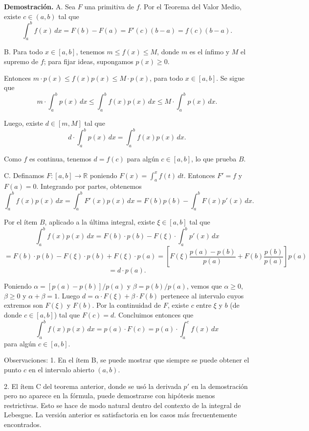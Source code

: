 \documentclass[12pt,oneside]{book}
\begin{document}
\textbf{Demostración.} A. Sea \(F\) una primitiva de \(f\). Por el Teorema del Valor Medio, existe \(c \in (a, b)\) tal que
\[
\int_{a}^{b} f(x) \, dx = F(b) - F(a) = F'(c)(b - a) = f(c)(b - a).
\]

B. Para todo \(x \in [a, b]\), tenemos \(m \leq f(x) \leq M\), donde \(m\) es el ínfimo y \(M\) el supremo de \(f\); para fijar ideas, supongamos \(p(x) \geq 0\).

Entonces \( m \cdot p(x) \leq f(x)p(x) \leq M \cdot p(x) \), para todo \( x \in [a, b] \). Se sigue que
\[
m \cdot \int_a^b p(x) \, dx \leq \int_a^b f(x)p(x) \, dx \leq M \cdot \int_a^b p(x) \, dx.
\]

Luego, existe \( d \in [m, M] \) tal que
\[
d \cdot \int_a^b p(x) \, dx = \int_a^b f(x)p(x) \, dx.
\]

Como \( f \) es continua, tenemos \( d = f(c) \) para algún \( c \in [a, b] \), lo que prueba \( B \).

C. Definamos \( F: [a, b] \to \mathbb{R} \) poniendo \( F(x) = \int_a^x f(t) \, dt \). Entonces \( F' = f \) y \( F(a) = 0 \). Integrando por partes, obtenemos
\[
\int_a^b f(x)p(x) \, dx = \int_a^b F'(x)p(x) \, dx = F(b)p(b) - \int_a^b F(x)p'(x) \, dx.
\]

Por el ítem \( B \), aplicado a la última integral, existe \( \xi \in [a, b] \) tal que
\[
\int_a^b f(x)p(x) \, dx = F(b) \cdot p(b) - F(\xi) \cdot \int_a^b p'(x) \, dx
\]
\[
= F(b) \cdot p(b) - F(\xi) \cdot p(b) + F(\xi) \cdot p(a) = \left[ F(\xi) \frac{p(a) - p(b)}{p(a)} + F(b) \frac{p(b)}{p(a)} \right] p(a)
\]
\[
= d \cdot p(a).
\]

Poniendo \( \alpha = [p(a) - p(b)]/p(a) \) y \( \beta = p(b)/p(a) \), vemos que \( \alpha \geq 0 \), \( \beta \geq 0 \) y \( \alpha + \beta = 1 \). Luego \( d = \alpha \cdot F(\xi) + \beta \cdot F(b) \) pertenece al intervalo cuyos extremos son \( F(\xi) \) y \( F(b) \). Por la continuidad de \( F \), existe \( c \) entre \( \xi \) y \( b \) (de donde \( c \in [a, b] \)) tal que \( F(c) = d \). Concluimos entonces que
\[
\int_a^b f(x)p(x) \, dx = p(a) \cdot F(c) = p(a) \cdot \int_a^c f(x) \, dx
\]
para algún \( c \in [a, b] \).

Observaciones: 1. En el ítem B, se puede mostrar que siempre se puede obtener el punto \(c\) en el intervalo abierto \((a, b)\).

2. El ítem C del teorema anterior, donde se usó la derivada \(p'\) en la demostración pero no aparece en la fórmula, puede demostrarse con hipótesis menos restrictivas. Esto se hace de modo natural dentro del contexto de la integral de Lebesgue. La versión anterior es satisfactoria en los casos más frecuentemente encontrados.
\end{document}
